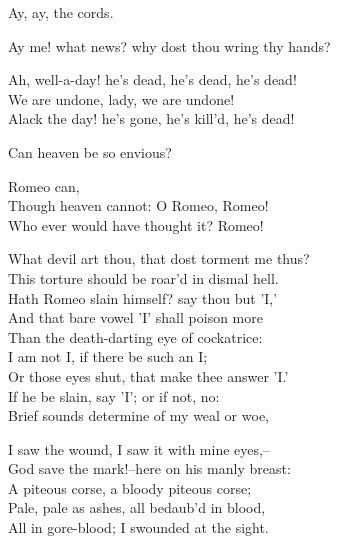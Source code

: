 \begin{speech}
Ay, ay, the cords. 
\\
\end{speech}
\begin{speech}
Ay me! what news? why dost thou wring thy hands? \\

\end{speech}
\begin{speech}
Ah, well-a-day! he's dead, he's dead, he's dead!
\\
We are undone, lady, we are undone! \\
Alack the day! he's gone, he's kill'd, he's dead! \\
\end{speech}
\begin{speech}
Can heaven be so envious? \\
\end{speech}
\begin{speech}
Romeo can, \\
Though heaven cannot: O Romeo, Romeo! \\
Who ever would have thought it? Romeo! \\
\end{speech}
\begin{speech}
What devil art thou, that dost torment me thus? \\

This torture should be roar'd in dismal hell. \\
Hath Romeo slain himself? say thou but 'I,' \\
And that bare vowel 'I' shall poison more \\
Than the death-darting eye of cockatrice: \\
I am not I, if there be such an I; \\
Or those eyes shut, that make thee answer 'I.' \\
If he be slain, say 'I'; or if not, no: \\
Brief sounds determine of my weal or woe, \\
\end{speech}
\begin{speech}
I saw the wound, I saw it with mine eyes,-- \\
God save the mark!--here on his manly breast: \\
A piteous corse, a bloody piteous corse; \\
Pale, pale as ashes, all bedaub'd in blood, \\
All in gore-blood; I swounded at the sight. \\
\end{speech}
